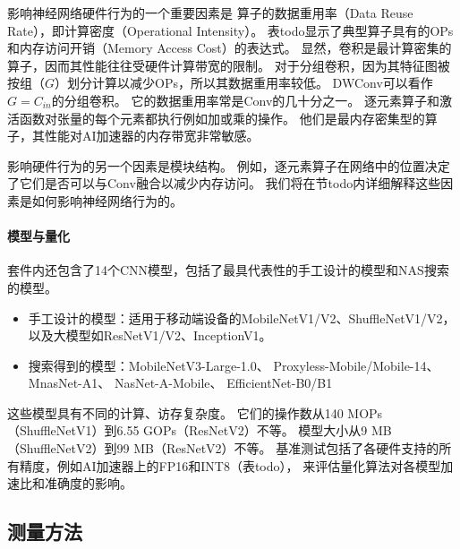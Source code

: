 影响神经网络硬件行为的一个重要因素是
算子的数据重用率（Data Reuse Rate），即计算密度（Operational Intensity）。
表todo显示了典型算子具有的OPs和内存访问开销（Memory Access Cost）的表达式。
显然，卷积是最计算密集的算子，因而其性能往往受硬件计算带宽的限制。
对于分组卷积，因为其特征图被按组（$G$）划分计算以减少OPs，所以其数据重用率较低。
DWConv可以看作$G = C_{in}$的分组卷积。
它的数据重用率常是Conv的几十分之一。
逐元素算子和激活函数对张量的每个元素都执行例如加或乘的操作。
他们是最内存密集型的算子，其性能对AI加速器的内存带宽非常敏感。

影响硬件行为的另一个因素是模块结构。
例如，逐元素算子在网络中的位置决定了它们是否可以与Conv融合以减少内存访问。
我们将在节todo内详细解释这些因素是如何影响神经网络行为的。

\paragraph{模型与量化}
套件内还包含了14个CNN模型，包括了最具代表性的手工设计的模型和NAS搜索的模型。
\begin{itemize}
    \item 手工设计的模型：适用于移动端设备的MobileNetV1/V2、ShuffleNetV1/V2，
    以及大模型如ResNetV1/V2、InceptionV1\cite{szegedy2015going}。
    \item 搜索得到的模型：MobileNetV3-Large-1.0\cite{howard2019searching}、
    Proxyless-Mobile/Mobile-14\cite{cai2018proxylessnas}、
    MnasNet-A1\cite{tan2019mnasnet}、
    NasNet-A-Mobile\cite{zoph2018learning}、
    EfficientNet-B0/B1\cite{tan2019efficientnet}
\end{itemize}
这些模型具有不同的计算、访存复杂度。
它们的操作数从140 MOPs（ShuffleNetV1）到6.55 GOPs（ResNetV2）不等。
模型大小从9 MB（ShuffleNetV2）到99 MB（ResNetV2）不等。
基准测试包括了各硬件支持的所有精度，例如AI加速器上的FP16和INT8（表todo），
来评估量化算法对各模型加速比和准确度的影响。

\subsection{测量方法}
\label{measurement}